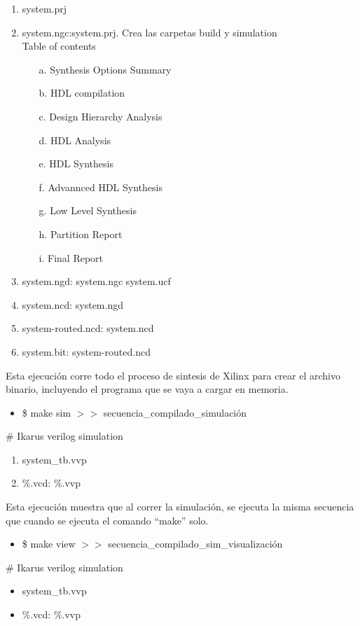 \documentclass[twocolumn]{IEEEtran}
\begin{document}
\begin{enumerate}
 \item system.prj
 \item system.ngc:system.prj. Crea las carpetas build y simulation\\
	Table of contents
	\begin{itemize}
	 \item[a.] Synthesis Options Summary
	 \item[b.] HDL compilation
	 \item[c.] Design Hierarchy Analysis
	 \item[d.] HDL Analysis
	 \item[e.] HDL Synthesis
	 \item[f.] Advannced HDL Synthesis
	 \item[g.] Low Level Synthesis
	 \item[h.] Partition Report
	 \item[i.] Final Report
	\end{itemize}
 \item system.ngd: system.ngc system.ucf
 \item system.ncd: system.ngd
 \item system-routed.ncd: system.ncd
 \item system.bit: system-routed.ncd
\end{enumerate}
\noindent
Esta ejecución corre todo el proceso de sintesis de Xilinx para crear el archivo binario, incluyendo el programa que se vaya a cargar en memoria.
\begin{itemize}
 \item \$ make sim $>>$ secuencia\_compilado\_simulación
\end{itemize}
\noindent
\# Ikarus verilog simulation
\begin{enumerate}
 \item system\_tb.vvp
 \item \%.vcd: \%.vvp
\end{enumerate}
\noindent
Esta ejecución muestra que al correr la simulación, se ejecuta la misma secuencia que cuando se ejecuta el comando ``make'' solo.
\begin{itemize}
 \item \$ make view $>>$ secuencia\_compilado\_sim\_visualización
\end{itemize}
\noindent
\# Ikarus verilog simulation
\begin{itemize}
 \item system\_tb.vvp
 \item \%.vcd: \%.vvp
\end{itemize}
\end{document}
